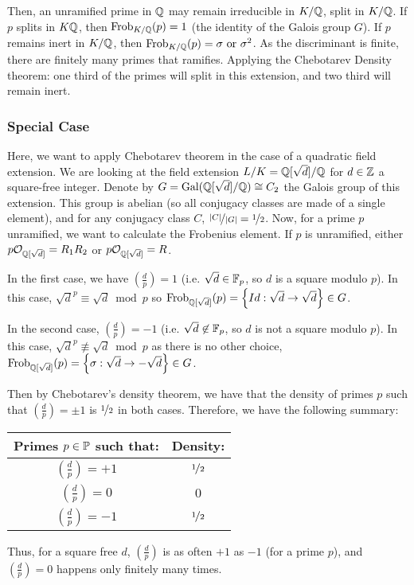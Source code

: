 Then, an unramified prime in $\mathbb{Q}$ may remain irreducible in $K/\mathbb{Q}$, split in $K/\mathbb{Q}$.
If $p$ splits in $K\mathbb{Q}$, then $\text{Frob}_{K/\mathbb{Q}}(p)=1$ (the identity of the Galois group $G$).
If $p$ remains inert in $K/\mathbb{Q}$, then $\text{Frob}_{K/\mathbb{Q}}(p)=\sigma \text{ or } \sigma^2$.
As the discriminant is finite, there are finitely many primes that ramifies.
Applying the Chebotarev Density theorem: one third of the primes will split in this extension, and two third will remain inert.

\subsubsection{Special Case}
Here, we want to apply Chebotarev theorem in the case of a quadratic field extension.
We are looking at the field extension $L/K = \mathbb{Q}[\sqrt{d}]/\mathbb{Q}$ for $d \in \mathbb{Z}$ a square-free integer.
Denote by $G = \text{Gal}(\mathbb{Q}[\sqrt{d}]/\mathbb{Q}) \cong C_2$ the Galois group of this extension.
This group is abelian (so all conjugacy classes are made of a single element), and for any conjugacy class $C$, $\nicefrac{|C|}{|G|} = \nicefrac{1}{2}$.
Now, for a prime $p$ unramified, we want to calculate the Frobenius element.
If $p$ is unramified, either $p \mathcal{O}_{\mathbb{Q}[\sqrt{d}]} = R_1R_2$ or $p \mathcal{O}_{\mathbb{Q}[\sqrt{d}]} = R$.

In the first case, we have $\left( \frac{d}{p} \right) = 1$ (i.e. $\sqrt{d} \in \mathbb{F}_p$, so $d$ is a square modulo $p$).
In this case, $\sqrt{d}^p \equiv \sqrt{d} \bmod p$ so $\text{Frob}_{\mathbb{Q}[\sqrt{d}]}(p) = \left\lbrace Id: \sqrt{d} \to \sqrt{d} \right\rbrace \in G$.

In the second case, $\left( \frac{d}{p} \right) = -1$ (i.e. $\sqrt{d} \not\in \mathbb{F}_p$, so $d$ is not a square modulo $p$).
In this case, $\sqrt{d}^p \not\equiv \sqrt{d} \bmod p$ as there is no other choice, $\text{Frob}_{\mathbb{Q}[\sqrt{d}]}(p) = \left\lbrace \sigma: \sqrt{d} \to -\sqrt{d} \right\rbrace \in G$.

Then by Chebotarev's density theorem, we have that the density of primes $p$ such that $\left( \frac{d}{p} \right) = \pm1$ is $\nicefrac{1}{2}$ in both cases.
Therefore, we have the following summary:
\begin{center}
	\begin{tabular}{|c|c|}
		\hline
		Primes $p \in \mathbb{P}$ such that: & Density:\\
		\hline
		$\left( \frac{d}{p} \right) = +1$ & $\nicefrac{1}{2}$\\
		$\left( \frac{d}{p} \right) =  0$ & $0$\\
		$\left( \frac{d}{p} \right) = -1$ & $\nicefrac{1}{2}$\\
		\hline
	\end{tabular}
\end{center}
Thus, for a square free $d$, $\left( \frac{d}{p} \right)$ is as often $+1$ as $-1$ (for a prime $p$), and  $\left( \frac{d}{p} \right) = 0$ happens only finitely many times.



